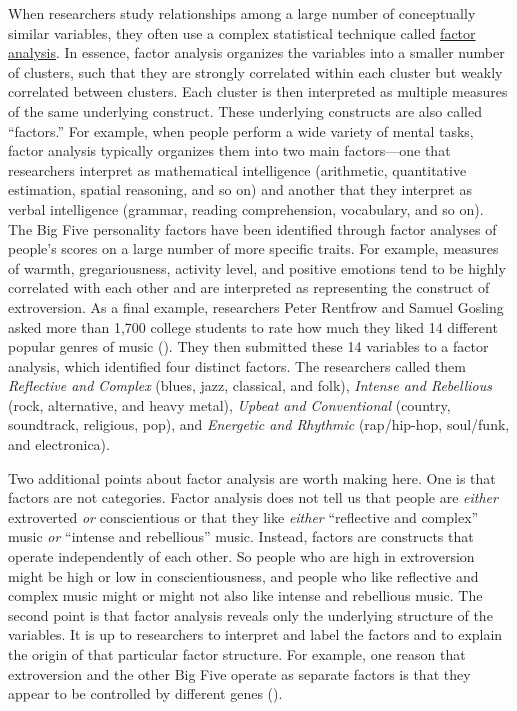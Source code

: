 \documentclass[
]{krantz}
\begin{document}
When researchers study relationships among a large number of conceptually similar variables, they often use a complex statistical technique called \hyperref[factor-analysis]{factor analysis}. In essence, factor analysis organizes the variables into a smaller number of clusters, such that they are strongly correlated within each cluster but weakly correlated between clusters. Each cluster is then interpreted as multiple measures of the same underlying construct. These underlying constructs are also called ``factors.'' For example, when people perform a wide variety of mental tasks, factor analysis typically organizes them into two main factors---one that researchers interpret as mathematical intelligence (arithmetic, quantitative estimation, spatial reasoning, and so on) and another that they interpret as verbal intelligence (grammar, reading comprehension, vocabulary, and so on). The Big Five personality factors have been identified through factor analyses of people's scores on a large number of more specific traits. For example, measures of warmth, gregariousness, activity level, and positive emotions tend to be highly correlated with each other and are interpreted as representing the construct of extroversion. As a final example, researchers Peter Rentfrow and Samuel Gosling asked more than 1,700 college students to rate how much they liked 14 different popular genres of music (). They then submitted these 14 variables to a factor analysis, which identified four distinct factors. The researchers called them \emph{Reflective and Complex} (blues, jazz, classical, and folk), \emph{Intense and Rebellious} (rock, alternative, and heavy metal), \emph{Upbeat and Conventional} (country, soundtrack, religious, pop), and \emph{Energetic and Rhythmic} (rap/hip-hop, soul/funk, and electronica).

Two additional points about factor analysis are worth making here. One is that factors are not categories. Factor analysis does not tell us that people are \emph{either} extroverted \emph{or} conscientious or that they like \emph{either} ``reflective and complex'' music \emph{or} ``intense and rebellious'' music. Instead, factors are constructs that operate independently of each other. So people who are high in extroversion might be high or low in conscientiousness, and people who like reflective and complex music might or might not also like intense and rebellious music. The second point is that factor analysis reveals only the underlying structure of the variables. It is up to researchers to interpret and label the factors and to explain the origin of that particular factor structure. For example, one reason that extroversion and the other Big Five operate as separate factors is that they appear to be controlled by different genes ().
\end{document}

